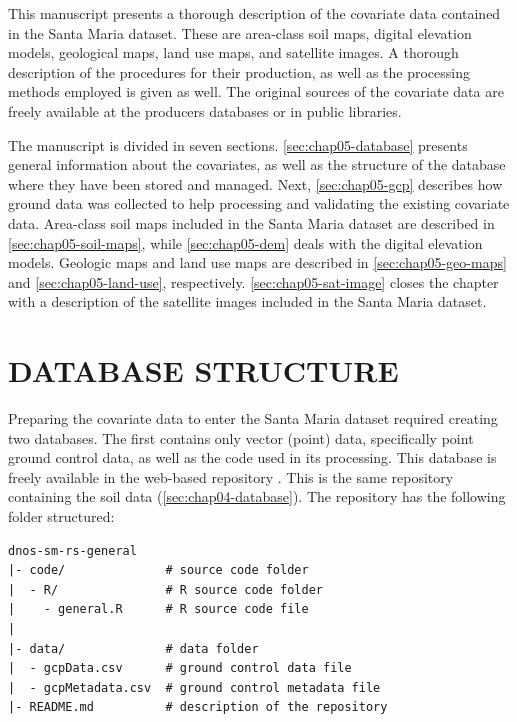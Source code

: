 This manuscript presents a thorough description of the covariate data contained in the Santa Maria dataset. 
These are area-class soil maps, digital elevation models, geological maps, land use maps, and satellite 
images. A thorough description of the procedures for their production, as well as the processing methods 
employed is given as well. The original sources of the covariate data are freely available at the producers 
databases or in public libraries.

The manuscript is divided in seven sections. \autoref{sec:chap05-database} presents general information about 
the covariates, as well as the structure of the database where they have been stored and managed. Next, 
\autoref{sec:chap05-gcp} describes how ground data was collected to help processing and validating the 
existing covariate data. Area-class soil maps included in the Santa Maria dataset are described in 
\autoref{sec:chap05-soil-maps}, while \autoref{sec:chap05-dem} deals with the digital elevation models. 
Geologic maps and land use maps are described in \autoref{sec:chap05-geo-maps} and 
\autoref{sec:chap05-land-use}, respectively. \autoref{sec:chap05-sat-image} closes the chapter with a 
description of the satellite images included in the Santa Maria dataset.

\section{DATABASE STRUCTURE}
\label{sec:chap05-database}

Preparing the covariate data to enter the Santa Maria dataset required creating two databases. The first 
contains only vector (point) data, specifically point ground control data, as well as the code used in its 
processing. This database is freely available in the web-based \git{} repository \github{}. This is the same 
repository containing the soil data (\autoref{sec:chap04-database}). The repository has the following folder 
structured:

\begin{verbatim}
dnos-sm-rs-general
|- code/              # source code folder
|  - R/               # R source code folder
|    - general.R      # R source code file
|
|- data/              # data folder
|  - gcpData.csv      # ground control data file
|  - gcpMetadata.csv  # ground control metadata file
|- README.md          # description of the repository
\end{verbatim}

\def\sirgas{\href{http://spatialreference.org/ref/epsg/31982/}{\texttt{EPSG:31982}}}

